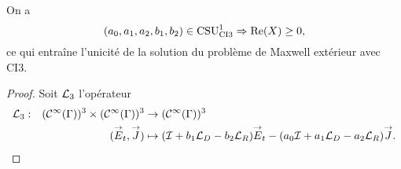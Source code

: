  \begin{prop}
    \label{prop:csu:ci3-1}
    On a 
    \begin{equation*}
      (a_0,a_1,a_2,b_1,b_2) \in \CSU[1]{CI3} \Rightarrow \Re(X)\ge 0,
    \end{equation*}
    ce qui entraîne l'unicité de la solution du problème de Maxwell extérieur avec CI3.
  \end{prop}

  \begin{proof}
    Soit \(\LL_3\) l'opérateur
    \begin{equation}
      \label{eq:unicite:ci3:L3}
      \fonction{\LL_3}{(\mathcal{C}^\infty(\Gamma))^3 \times (\mathcal{C}^\infty(\Gamma))^3}{(\mathcal{C}^\infty(\Gamma))^3}
      {(\vE_t,\vJ)}{( \oI + b_1 \LD - b_2 \LR) \vE_t - (a_0\oI + a_1 \LD - a_2 \LR ) \vJ.}
    \end{equation}


\end{proof}
